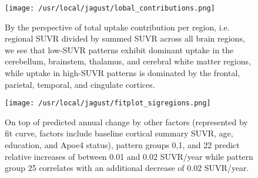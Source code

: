 \documentclass{article}
\begin{document}
\begin{figure}
\texttt{[image: /usr/local/jagust/lobal\_contributions.png]}
\caption{By the perspective of total uptake contribution per region, i.e. regional SUVR divided by summed SUVR across all brain regions, we see that low-SUVR patterns exhibit dominant uptake in the cerebellum, brainstem, thalamus, and cerebral white matter regions, while uptake in high-SUVR patterns is dominated by the frontal, parietal, temporal, and cingulate cortices.}
\end{figure}

\begin{figure}
\texttt{[image: /usr/local/jagust/fitplot\_sigregions.png]}
\caption{On top of predicted annual change by other factors (represented by fit curve, factors include baseline cortical summary SUVR, age, education, and Apoe4 status), pattern groups 0,1, and 22 predict relative increases of between 0.01 and 0.02 SUVR/year while pattern group 25 correlates with an additional decrease of 0.02 SUVR/year.}
\end{figure}
\end{document}

